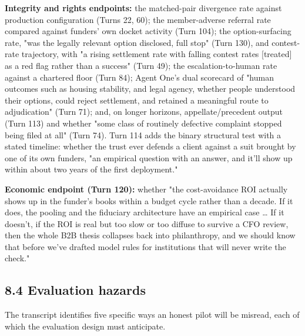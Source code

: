 \documentclass[sigconf,nonacm=true]{acmart}
\begin{document}
\textbf{Integrity and rights endpoints:} the matched-pair divergence rate against production configuration (Turns 22, 60); the member-adverse referral rate compared against funders' own docket activity (Turn 104); the option-surfacing rate,  "was the legally relevant option disclosed, full stop" (Turn 130),  and contest-rate trajectory, with "a rising settlement rate with falling contest rates [treated] as a red flag rather than a success" (Turn 49); the escalation-to-human rate against a chartered floor (Turn 84); Agent One's dual scorecard of "human outcomes such as housing stability, and legal agency,  whether people understood their options, could reject settlement, and retained a meaningful route to adjudication" (Turn 71); and, on longer horizons, appellate/precedent output (Turn 113) and whether "some class of routinely defective complaint stopped being filed at all" (Turn 74). Turn 114 adds the binary structural test with a stated timeline: whether the trust ever defends a client against a suit brought by one of its own funders,  "an empirical question with an answer, and it'll show up within about two years of the first deployment."

\textbf{Economic endpoint (Turn 120):} whether "the cost-avoidance ROI actually shows up in the funder's books within a budget cycle rather than a decade. If it does, the pooling and the fiduciary architecture have an empirical case … If it doesn't,  if the ROI is real but too slow or too diffuse to survive a CFO review,  then the whole B2B thesis collapses back into philanthropy, and we should know that before we've drafted model rules for institutions that will never write the check."

\subsection{8.4 Evaluation hazards}

The transcript identifies five specific ways an honest pilot will be misread, each of which the evaluation design must anticipate.
\end{document}
